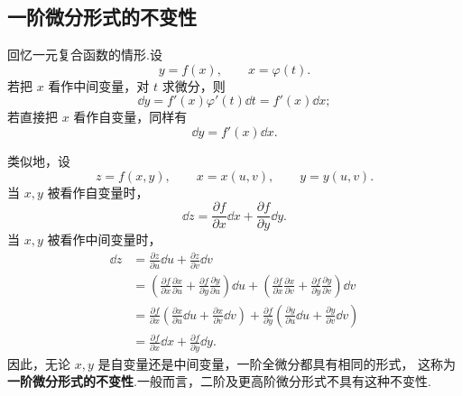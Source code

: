 \subsection*{一阶微分形式的不变性}

回忆一元复合函数的情形.设
\[
y=f(x),\qquad x=\varphi(t).
\]
若把 $x$ 看作中间变量，对 $t$ 求微分，则
\[
\dd y=f'(x)\varphi'(t)\dd t=f'(x)\dd x;
\]
若直接把 $x$ 看作自变量，同样有
\[
\dd y=f'(x)\dd x.
\]

类似地，设
\[
z=f(x,y),
\qquad
x=x(u,v),
\qquad
y=y(u,v).
\]
当 $x,y$ 被看作自变量时，
\[
\dd z=\frac{\partial f}{\partial x}\dd x
+\frac{\partial f}{\partial y}\dd y.
\]
当 $x,y$ 被看作中间变量时，
\[
\begin{aligned}
\dd z
&=
\frac{\partial z}{\partial u}\dd u
+
\frac{\partial z}{\partial v}\dd v\\
&=
\left(
\frac{\partial f}{\partial x}\frac{\partial x}{\partial u}
+
\frac{\partial f}{\partial y}\frac{\partial y}{\partial u}
\right)\dd u
+
\left(
\frac{\partial f}{\partial x}\frac{\partial x}{\partial v}
+
\frac{\partial f}{\partial y}\frac{\partial y}{\partial v}
\right)\dd v\\
&=
\frac{\partial f}{\partial x}
\left(
\frac{\partial x}{\partial u}\dd u
+
\frac{\partial x}{\partial v}\dd v
\right)
+
\frac{\partial f}{\partial y}
\left(
\frac{\partial y}{\partial u}\dd u
+
\frac{\partial y}{\partial v}\dd v
\right)\\
&=
\frac{\partial f}{\partial x}\dd x
+
\frac{\partial f}{\partial y}\dd y.
\end{aligned}
\]
因此，无论 $x,y$ 是自变量还是中间变量，一阶全微分都具有相同的形式，
这称为\textbf{一阶微分形式的不变性}.一般而言，二阶及更高阶微分形式不具有这种不变性.

